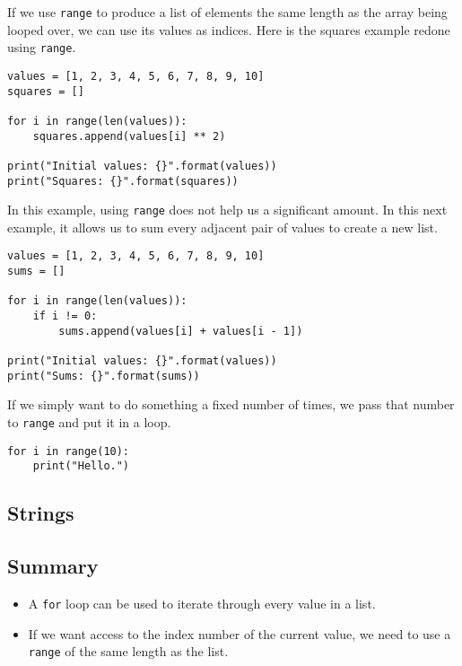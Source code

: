 \documentclass[11pt]{cselabheader}
\begin{document}
If we use \lstinline{range} to produce a list of elements the same length as the array being looped over, we can use its values as indices. Here is the squares example redone using \lstinline{range}.

\begin{lstlisting}[style=python]
values = [1, 2, 3, 4, 5, 6, 7, 8, 9, 10]
squares = []

for i in range(len(values)):
    squares.append(values[i] ** 2)

print("Initial values: {}".format(values))
print("Squares: {}".format(squares))
\end{lstlisting}

In this example, using \lstinline{range} does not help us a significant amount. In this next example, it allows us to sum every adjacent pair of values to create a new list.

\begin{lstlisting}[style=python]
values = [1, 2, 3, 4, 5, 6, 7, 8, 9, 10]
sums = []

for i in range(len(values)):
    if i != 0:
        sums.append(values[i] + values[i - 1])

print("Initial values: {}".format(values))
print("Sums: {}".format(sums))
\end{lstlisting}

If we simply want to do something a fixed number of times, we pass that number to \lstinline{range} and put it in a loop.

\begin{lstlisting}[style=python]
for i in range(10):
    print("Hello.")
\end{lstlisting}


\subsection{Strings}

\subsection{Summary}
\begin{itemize}
  \item A \lstinline{for} loop can be used to iterate through every value in a list.
  \item If we want access to the index number of the current value, we need to use a \lstinline{range} of the same length as the list.
\end{itemize}
\end{document}
